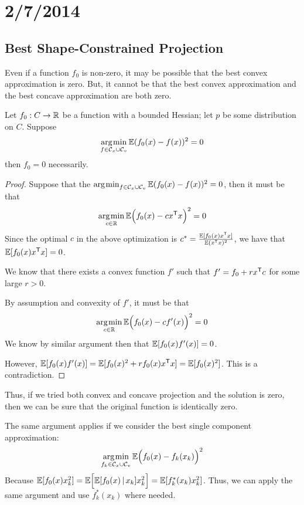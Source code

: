 \documentclass{article}
\begin{document}
\newpage
\section{2/7/2014}

\subsection{Best Shape-Constrained Projection}

Even if a function $f_0$ is non-zero, it may be possible that the best convex approximation is zero. But, it cannot be that the best convex approximation and the best concave approximation are both zero.

\begin{theorem}
Let $f_0: C \rightarrow \mathbb{R}$ be a function with a bounded Hessian; let $p$ be some distribution on $C$.
Suppose 
\[
\mathop{\rm arg\kern.2ex min}_{f \in \mathcal{C}_x \cup \mathcal{C}_v} 
   \mathbb{E} (f_0(x) - f(x))^2  = 0
\]
 then $f_0 = 0$ necessarily.
\end{theorem}

\begin{proof}

Suppose that the $\mathop{\rm arg\kern.2ex min}_{f \in \mathcal{C}_x \cup \mathcal{C}_v} \mathbb{E}( f_0(x) - f(x))^2 = 0$, then it must be that 
\[
\mathop{\rm arg\kern.2ex min}_{c \in \mathbb{R}} \mathbb{E}\Big( f_0(x) - c x^{\mathsf{T}} x \Big)^2 = 0
\]
Since the optimal $c$ in the above optimization is 
$c^* = \frac{\mathbb{E}[ f_0(x) x^{\mathsf{T}} x ]}{\mathbb{E} (x^{\mathsf{T}} x)^2 }$, 
we have that $\mathbb{E}[ f_0(x) x^{\mathsf{T}} x]=0$.

We know that there exists a convex function $f'$ such that $f' = f_0 + r x^{\mathsf{T}} c$ for some large $r > 0$. 

By assumption and convexity of $f'$, it must be that 
\[
\mathop{\rm arg\kern.2ex min}_{c \in \mathbb{R}} \mathbb{E}\Big( f_0(x) - c f'(x) \Big)^2 = 0
\]
We know by similar argument then that $\mathbb{E}[ f_0(x) f'(x) ] =0$. 

However, $\mathbb{E}[ f_0(x) f'(x) ] = \mathbb{E}[f_0(x)^2 + r f_0(x) x^{\mathsf{T}} x ] = \mathbb{E}[ f_0(x)^2]$. This is a contradiction. 

\end{proof}

Thus, if we tried both convex and concave projection and the solution is zero, then we can be sure that the original function is identically zero.

The same argument applies if we consider the best single component approximation:
\[
\mathop{\rm arg\kern.2ex min}_{f_k \in \mathcal{C}_x \cup \mathcal{C}_v} 
\mathbb{E}\Big( f_0(x) - f_k(x_k) \Big)^2
\]
Because $\mathbb{E}[ f_0(x) x_k^2 ] = \mathbb{E}\Big[ \mathbb{E}[f_0(x) \,|\, x_k] x_k^2\Big] 
= \mathbb{E}[ f^*_k(x_k) x_k^2]$.
Thus, we can apply the same argument and use $f^*_k(x_k)$ where needed.
\end{document}
